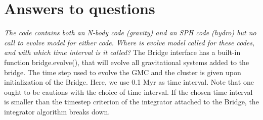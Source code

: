\documentclass{aa}
\newcommand{\Sun}[0]{\ensuremath{_{\odot}}}
\begin{document}

\section{Answers to questions}


\textit{The code contains both an N-body code (gravity) and an SPH code (hydro) but no call to evolve model for either code. Where is evolve model called for these codes, and with which time interval is it called?} The Bridge interface has a built-in function bridge.evolve(), that will evolve all gravitational systems added to the bridge. The time step used to evolve the GMC and the cluster is given upon initialization of the Bridge. Here, we use 0.1 Myr as time interval. Note that one ought to be cautions with the choice of time interval. If the chosen time interval is smaller than the timestep criterion of the integrator attached to the Bridge, the integrator algorithm breaks down.
\end{document}
